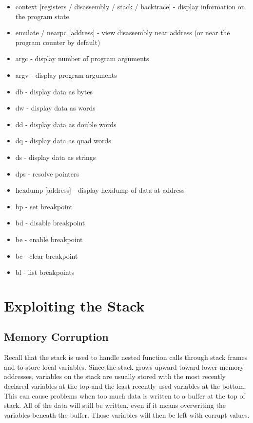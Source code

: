 \documentclass{article}
\begin{document}
\begin{itemize}
    \item context [registers / disassembly / stack / backtrace] - display
        information on the program state
    \item emulate / nearpc [address] - view disassembly near address (or near
        the program counter by default)
    \item argc - display number of program arguments
    \item argv - display program arguments
    \item db - display data as bytes
    \item dw - display data as words
    \item dd - display data as double words
    \item dq - display data as quad words
    \item ds - display data as strings
    \item dps - resolve pointers
    \item hexdump [address] - display hexdump of data at address
    \item bp - set breakpoint
    \item bd - disable breakpoint
    \item be - enable breakpoint
    \item bc - clear breakpoint
    \item bl - list breakpoints
\end{itemize}

\section{Exploiting the Stack}


\subsection{Memory Corruption}
Recall that the stack is used to handle nested function calls through stack
frames and to store local variables. Since the stack grows upward toward lower
memory addresses, variables on the stack are usually stored with the most
recently declared variables at the top and the least recently used variables at
the bottom. This can cause problems when too much data is written to a buffer
at the top of stack. All of the data will still be written, even if it means
overwriting the variables beneath the buffer. Those variables will then be left
with corrupt values.
\end{document}
